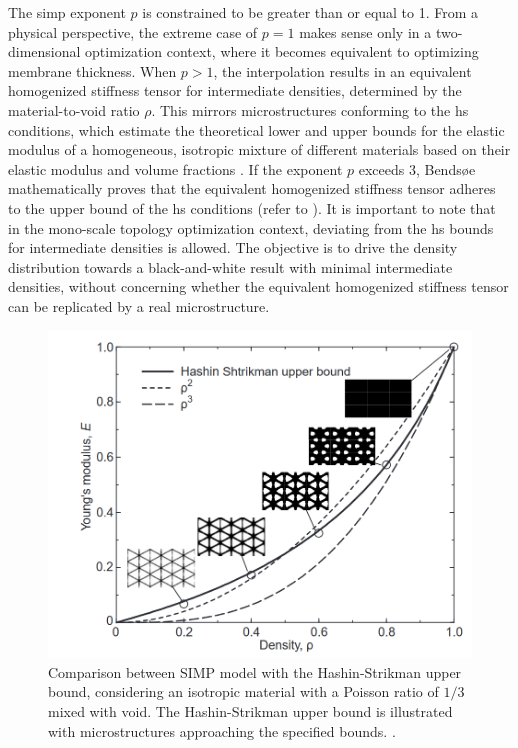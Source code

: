 The \gls{simp} exponent $p$ is constrained to be greater than or equal to 1. From a physical perspective, the extreme case of $p = 1$ makes sense only in a two-dimensional optimization context, where it becomes equivalent to optimizing membrane thickness. When $p > 1$, the interpolation results in an equivalent homogenized stiffness tensor for intermediate densities, determined by the material-to-void ratio $\rho$. This mirrors microstructures conforming to the \gls{hs} conditions, which estimate the theoretical lower and upper bounds for the elastic modulus of a homogeneous, isotropic mixture of different materials based on their elastic modulus and volume fractions . If the exponent $p$ exceeds 3, Bendsøe  mathematically proves that the equivalent homogenized stiffness tensor adheres to the upper bound of the \gls{hs} conditions (refer to ). It is important to note that in the mono-scale topology optimization context, deviating from the \gls{hs} bounds for intermediate densities is allowed. The objective is to drive the density distribution towards a black-and-white result with minimal intermediate densities, without concerning whether the equivalent homogenized stiffness tensor can be replicated by a real microstructure.

\begin{figure}
    \centering
    \includegraphics[width=0.75\linewidth]{figures/02_literature/simp.png}
    \caption{Comparison between SIMP model with the Hashin-Strikman upper bound, considering an isotropic material with a Poisson ratio of $1/3$ mixed with void. The Hashin-Strikman upper bound is illustrated with microstructures approaching the specified bounds. \cite{bendsoe_material_1999}.}
    \label{fig:02_simp}
\end{figure}

